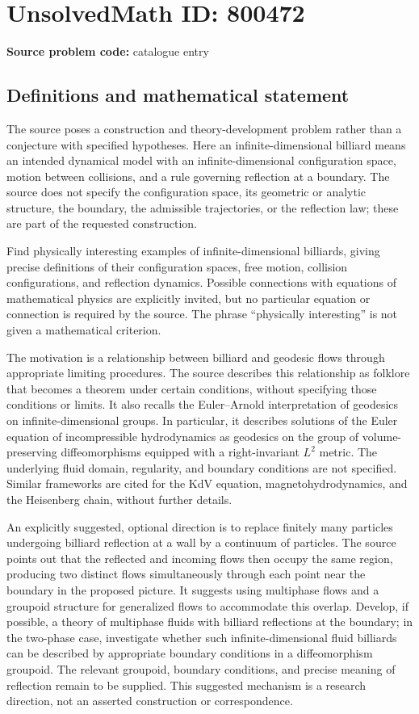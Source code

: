 \documentclass[11pt]{article}
\begin{document}
\section*{UnsolvedMath ID: 800472}
\textbf{Source problem code:} catalogue entry
\subsection{Definitions and mathematical statement}
The source poses a construction and theory-development problem rather than a conjecture with specified hypotheses. Here an infinite-dimensional billiard means an intended dynamical model with an infinite-dimensional configuration space, motion between collisions, and a rule governing reflection at a boundary. The source does not specify the configuration space, its geometric or analytic structure, the boundary, the admissible trajectories, or the reflection law; these are part of the requested construction.

Find physically interesting examples of infinite-dimensional billiards, giving precise definitions of their configuration spaces, free motion, collision configurations, and reflection dynamics. Possible connections with equations of mathematical physics are explicitly invited, but no particular equation or connection is required by the source. The phrase ``physically interesting'' is not given a mathematical criterion.

The motivation is a relationship between billiard and geodesic flows through appropriate limiting procedures. The source describes this relationship as folklore that becomes a theorem under certain conditions, without specifying those conditions or limits. It also recalls the Euler--Arnold interpretation of geodesics on infinite-dimensional groups. In particular, it describes solutions of the Euler equation of incompressible hydrodynamics as geodesics on the group of volume-preserving diffeomorphisms equipped with a right-invariant \(L^2\) metric. The underlying fluid domain, regularity, and boundary conditions are not specified. Similar frameworks are cited for the KdV equation, magnetohydrodynamics, and the Heisenberg chain, without further details.

An explicitly suggested, optional direction is to replace finitely many particles undergoing billiard reflection at a wall by a continuum of particles. The source points out that the reflected and incoming flows then occupy the same region, producing two distinct flows simultaneously through each point near the boundary in the proposed picture. It suggests using multiphase flows and a groupoid structure for generalized flows to accommodate this overlap. Develop, if possible, a theory of multiphase fluids with billiard reflections at the boundary; in the two-phase case, investigate whether such infinite-dimensional fluid billiards can be described by appropriate boundary conditions in a diffeomorphism groupoid. The relevant groupoid, boundary conditions, and precise meaning of reflection remain to be supplied. This suggested mechanism is a research direction, not an asserted construction or correspondence.
\end{document}
